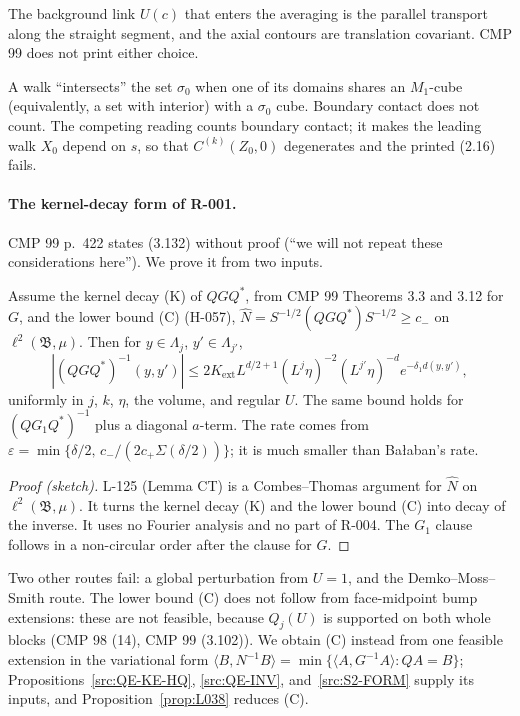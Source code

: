 \begin{convention}\label{conv:src-R001}
The background link $U(c)$ that enters the averaging is the parallel transport along the straight segment, and the axial contours are translation covariant. CMP 99 does not print either choice.
\end{convention}

\begin{convention}\label{conv:src-intersect}
A walk ``intersects'' the set $\sigma_0$ when one of its domains shares an $M_1$-cube (equivalently, a set with interior) with a $\sigma_0$ cube. Boundary contact does not count. The competing reading counts boundary contact; it makes the leading walk $X_0$ depend on $s$, so that $C^{(k)}(Z_0,0)$ degenerates and the printed (2.16) fails.
\end{convention}

\paragraph{The kernel-decay form of R-001.}
CMP 99 p.~422 states (3.132) without proof (``we will not repeat these considerations here''). We prove it from two inputs.

\begin{proposition}\label{src:A1-KERNEL}
Assume the kernel decay (K) of $QGQ^*$, from CMP 99 Theorems 3.3 and 3.12 for $G$, and the lower bound (C) (H-057), $\hat N=S^{-1/2}(QGQ^*)S^{-1/2}\ge c_-$ on $\ell^2(\mathfrak B,\mu)$. Then for $y\in\Lambda_j$, $y'\in\Lambda_{j'}$,
\[
|(QGQ^*)^{-1}(y,y')|\le 2K_{\mathrm{ext}}L^{d/2+1}(L^j\eta)^{-2}(L^{j'}\eta)^{-d}e^{-\delta_1 d(y,y')},
\]
uniformly in $j$, $k$, $\eta$, the volume, and regular $U$. The same bound holds for $(QG_1Q^*)^{-1}$ plus a diagonal $a$-term. The rate comes from $\varepsilon=\min\{\delta/2,\,c_-/(2c_+\Sigma(\delta/2))\}$; it is much smaller than Ba{\l}aban's rate.
\end{proposition}
\begin{proof}[Proof (sketch)]
L-125 (Lemma CT) is a Combes--Thomas argument for $\hat N$ on $\ell^2(\mathfrak B,\mu)$. It turns the kernel decay (K) and the lower bound (C) into decay of the inverse. It uses no Fourier analysis and no part of R-004. The $G_1$ clause follows in a non-circular order after the clause for $G$.
\end{proof}
Two other routes fail: a global perturbation from $U=1$, and the Demko--Moss--Smith route. The lower bound (C) does not follow from face-midpoint bump extensions: these are not feasible, because $Q_j(U)$ is supported on both whole blocks (CMP 98 (14), CMP 99 (3.102)). We obtain (C) instead from one feasible extension in the variational form $\langle B,N^{-1}B\rangle=\min\{\langle A,G^{-1}A\rangle: QA=B\}$; Propositions~\ref{src:QE-KE-HQ}, \ref{src:QE-INV}, and~\ref{src:S2-FORM} supply its inputs, and Proposition~\ref{prop:L038} reduces (C).

